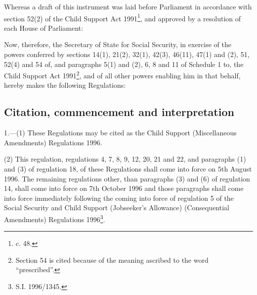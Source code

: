 \documentclass[12pt,a4paper]{article}
\title{\regstitle}
\author{S.I. 1996 No. 1945}
\date{Made 23rd July 1996\\Coming into force:\\
Regulations 1, 4, 7, 8, 9, 12, 20, 21 and 22 and paragraphs (1) and (3) of regulation 18 5th August 1996\\Remainder 7th October 1996}
\begin{document}
\maketitle

\noindent
Whereas a draft of this instrument was laid before Parliament in accordance with section 52(2) of the Child Support Act 1991\footnote{ c. 48.}, and approved by a resolution of each House of Parliament:

 Now, therefore, the Secretary of State for Social Security, in exercise of the powers conferred by sections 14(1), 21(2), 32(1), 42(3), 46(11), 47(1) and (2), 51, 52(4) and 54 of, and paragraphs 5(1) and (2), 6, 8 and 11 of Schedule 1 to, the Child Support Act 1991\footnote{\frenchspacing Section 54 is cited because of the meaning ascribed to the word “prescribed”.}, and of all other powers enabling him in that behalf, hereby makes the following Regulations:

{\sloppy

\tableofcontents

}

\setcounter{secnumdepth}{-2}

\subsection[1. Citation, commencement and interpretation]{Citation, commencement and interpretation}

1.—(1) These Regulations may be cited as the Child Support (Miscellaneous Amendments) Regulations 1996.

(2) This regulation, regulations 4, 7, 8, 9, 12, 20, 21 and 22, and paragraphs (1) and (3) of regulation 18, of these Regulations shall come into force on 5th August 1996. The remaining regulations other, than paragraphs (3) and (6) of regulation 14, shall come into force on 7th October 1996 and those paragraphs shall come into force immediately following the coming into force of regulation 5 of the Social Security and Child Support (Jobseeker’s Allowance) (Consequential Amendments) Regulations 1996\footnote{\frenchspacing S.I. 1996/1345.}.
\end{document}
